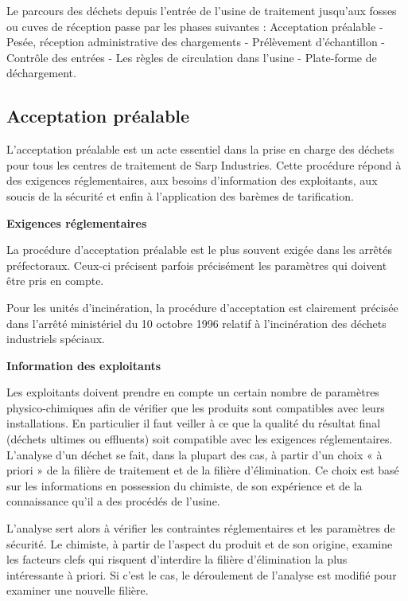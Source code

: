 Le parcours des déchets depuis l’entrée de l’usine de traitement jusqu’aux fosses ou cuves de réception passe par les phases suivantes : Acceptation préalable - Pesée, réception administrative des chargements - Prélèvement d’échantillon - Contrôle des entrées - Les règles de circulation dans l’usine - Plate-forme de déchargement.


\subsection{Acceptation préalable}

L’acceptation préalable est un acte essentiel dans la prise en charge des déchets pour tous les centres de traitement de Sarp Industries. Cette procédure répond à des exigences réglementaires, aux besoins d’information des exploitants, aux soucis de la sécurité et enfin à l’application des barèmes de tarification.

\vspace{0.3cm}
\newpage
\textbf{Exigences réglementaires}
\vspace{0.3cm}

La procédure d’acceptation préalable est le plus souvent exigée dans les arrêtés préfectoraux. Ceux-ci précisent parfois précisément les paramètres qui doivent être pris en compte.

Pour les unités d’incinération, la procédure d’acceptation est clairement précisée dans l’arrêté ministériel du 10 octobre 1996 relatif à l’incinération des déchets industriels spéciaux.

\vspace{0.3cm}
\textbf{Information des exploitants}
\vspace{0.3cm}

Les exploitants doivent prendre en compte un certain nombre de paramètres physico-chimiques afin de vérifier que les produits sont compatibles avec leurs installations. En particulier il faut veiller à ce que la qualité du résultat final (déchets ultimes ou effluents) soit compatible avec les exigences réglementaires.
L’analyse d’un déchet se fait, dans la plupart des cas, à partir d’un choix « à priori » de la filière de traitement et de la filière d’élimination. Ce choix est basé sur les informations en possession du chimiste, de son expérience et de la connaissance qu’il a des procédés de l’usine.
\vspace{0.3cm}

L’analyse sert alors à vérifier les contraintes réglementaires et les paramètres de sécurité. Le chimiste, à partir de l’aspect du produit et de son origine, examine les facteurs clefs qui risquent d’interdire la filière d’élimination la plus intéressante à priori. Si c’est le cas, le déroulement de l’analyse est modifié pour examiner une nouvelle filière.
\vspace{0.3cm}

